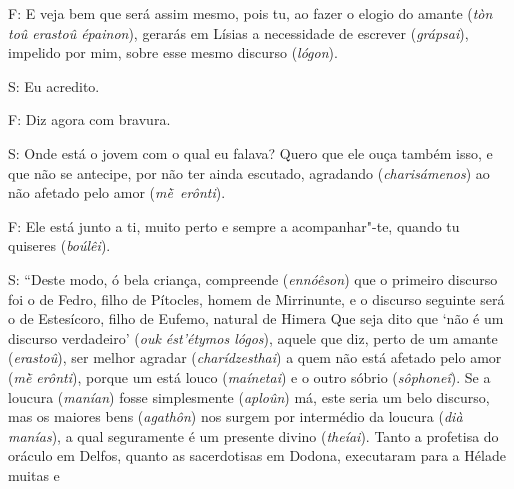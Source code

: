 F: E veja bem que será assim mesmo, pois tu, ao fazer o elogio do amante
(\emph{tòn toû erastoû épainon}), gerarás em Lísias a necessidade de
escrever (\emph{grápsai}), impelido por mim, \bekker{[243e]} sobre esse mesmo
discurso (\emph{lógon}).

S: Eu acredito.

F: Diz agora com bravura.

S: Onde está o jovem com o qual eu falava? Quero que ele ouça também
isso, e que não se antecipe, por não ter ainda escutado, agradando
(\emph{charisámenos}) ao não afetado pelo amor (\emph{mḕ~erônti}).

F: Ele está junto a ti, muito perto e sempre a acompanhar"-te, quando tu
quiseres (\emph{boúlêi}).

S: ``Deste modo, ó bela criança, compreende (\emph{ennóêson}) que o
primeiro discurso foi o de Fedro, filho de Pítocles, homem de
Mirrinunte, \bekker{[244a]} e o discurso seguinte será o de Estesícoro, filho
de Eufemo, natural de Himera Que seja dito
que `não é um discurso verdadeiro' (\emph{ouk ést'étymos
lógos}), aquele que diz, perto de um amante
(\emph{erastoû}), ser melhor agradar (\emph{charídzesthai}) a quem não
está afetado pelo amor (\emph{mḕ erônti}), porque um está louco
(\emph{maínetai}) e o outro sóbrio (\emph{sôphoneî}). Se a loucura
(\emph{manían}) fosse simplesmente (\emph{aploûn}) má, este seria um
belo discurso, mas os maiores bens (\emph{agathôn}) nos surgem por
intermédio da loucura (\emph{dià manías}), a qual seguramente é um
presente divino (\emph{theíai}). Tanto a profetisa do oráculo em Delfos,
quanto as sacerdotisas em Dodona, executaram para a Hélade muitas e
